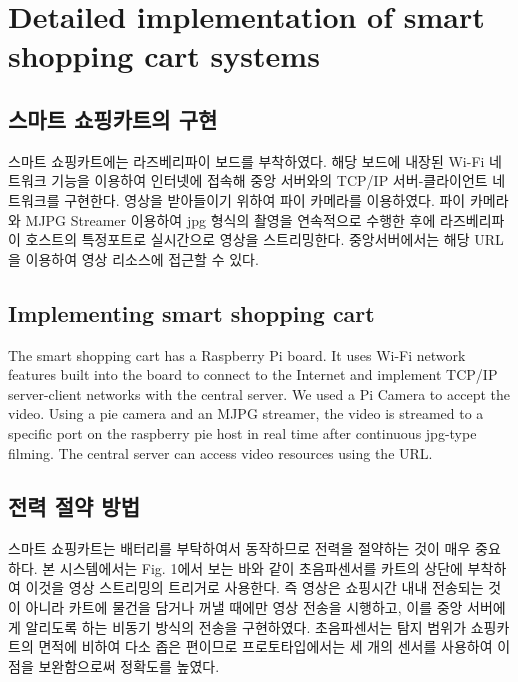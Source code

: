 \documentclass[smallextended]{svjour3}       %
\begin{document}
\hypertarget{detailed-implementation-of-smart-shopping-cart-systems}{%
\section{Detailed implementation of smart shopping cart
systems}\label{detailed-implementation-of-smart-shopping-cart-systems}}

\hypertarget{uxc2a4uxb9c8uxd2b8-uxc1fcuxd551uxce74uxd2b8uxc758-uxad6cuxd604}{%
\subsection{스마트 쇼핑카트의
구현}\label{uxc2a4uxb9c8uxd2b8-uxc1fcuxd551uxce74uxd2b8uxc758-uxad6cuxd604}}

스마트 쇼핑카트에는 라즈베리파이 보드를 부착하였다. 해당 보드에 내장된
Wi-Fi 네트워크 기능을 이용하여 인터넷에 접속해 중앙 서버와의 TCP/IP
서버-클라이언트 네트워크를 구현한다. 영상을 받아들이기 위하여 파이
카메라를 이용하였다. 파이 카메라와 MJPG Streamer 이용하여 jpg 형식의
촬영을 연속적으로 수행한 후에 라즈베리파이 호스트의 특정포트로
실시간으로 영상을 스트리밍한다. 중앙서버에서는 해당 URL을 이용하여 영상
리소스에 접근할 수 있다.

\hypertarget{implementing-smart-shopping-cart}{%
\subsection{Implementing smart shopping
cart}\label{implementing-smart-shopping-cart}}

The smart shopping cart has a Raspberry Pi board. It uses Wi-Fi network
features built into the board to connect to the Internet and implement
TCP/IP server-client networks with the central server. We used a Pi
Camera to accept the video. Using a pie camera and an MJPG streamer, the
video is streamed to a specific port on the raspberry pie host in real
time after continuous jpg-type filming. The central server can access
video resources using the URL.

\hypertarget{uxc804uxb825-uxc808uxc57d-uxbc29uxbc95}{%
\subsection{전력 절약
방법}\label{uxc804uxb825-uxc808uxc57d-uxbc29uxbc95}}

스마트 쇼핑카트는 배터리를 부탁하여서 동작하므로 전력을 절약하는 것이
매우 중요하다. 본 시스템에서는 Fig. 1에서 보는 바와 같이 초음파센서를
카트의 상단에 부착하여 이것을 영상 스트리밍의 트리거로 사용한다. 즉
영상은 쇼핑시간 내내 전송되는 것이 아니라 카트에 물건을 담거나 꺼낼
때에만 영상 전송을 시행하고, 이를 중앙 서버에게 알리도록 하는 비동기
방식의 전송을 구현하였다. 초음파센서는 탐지 범위가 쇼핑카트의 면적에
비하여 다소 좁은 편이므로 프로토타입에서는 세 개의 센서를 사용하여 이
점을 보완함으로써 정확도를 높였다.
\end{document}
